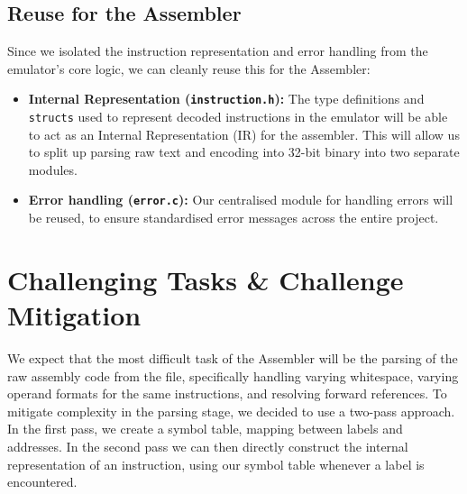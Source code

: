 \documentclass[11pt]{article}
\begin{document}
\subsection{Reuse for the Assembler}
Since we isolated the instruction representation and error handling from the emulator's core logic, we can cleanly reuse this for the Assembler:
\vspace{-0.1cm}
\begin{itemize}
    \item \textbf{Internal Representation (\texttt{instruction.h}):} The type definitions and \texttt{structs} used to represent decoded instructions in the emulator will be able to act as an Internal Representation (IR) for the assembler. This will allow us to split up parsing raw text and encoding into 32-bit binary into two separate modules.
    \vspace{-0.1cm}
    \item \textbf{Error handling (\texttt{error.c}):} Our centralised module for handling errors will be reused, to ensure standardised error messages across the entire project.
\end{itemize}
\section{Challenging Tasks \& Challenge Mitigation}
\vspace{-0.1cm}
We expect that the most difficult task of the Assembler will be the parsing of the raw assembly code from the file, specifically handling varying whitespace, varying operand formats for the same instructions, and resolving forward references.
To mitigate complexity in the parsing stage, we decided to use a two-pass approach. In the first pass, we create a symbol table, mapping between labels and addresses. In the second pass we can then directly construct the internal representation of an instruction, using our symbol table whenever a label is encountered.
\end{document}
